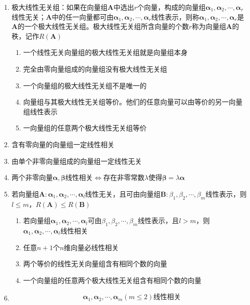 \documentclass[12pt]{book}
\begin{document}
\begin{enumerate}[1.]
    \item 极大线性无关组：如果在向量组$\bm{A}$中选出$r$个向量，构成的向量组$\bm{\alpha}_1,\bm{\alpha}_2,\cdots,\bm{\alpha}_r$线性无关；$\bm{A}$中的任一向量都可由$\bm{\alpha}_1,\bm{\alpha}_2,\cdots,\bm{\alpha}_r$线性表示，则称$\bm{\alpha}_1,\bm{\alpha}_2,\cdots,\bm{\alpha}_r$是$\bm{A}$的一个极大线性无关组。极大线性无关组所含向量的个数$r$称为向量组$\bm{A}$的秩，记作$R(\bm{A})$
    \begin{enumerate}[(1)]
        \item 一个线性无关向量组的极大线性无关组就是向量组本身
        \item 完全由零向量组成的向量组没有极大线性无关组
        \item 一个向量组的极大线性无关组不是唯一的
        \item 向量组与其极大线性无关组等价。他们的任意向量可以由等价的另一向量组线性表示
        \item 一向量组的任意两个极大线性无关组等价
    \end{enumerate}
    \item 含有零向量的向量组一定线性相关
    \item 由单个非零向量组成的向量组一定线性无关
    \item 两个非零向量$\bm{\alpha},\bm{\beta}$线性相关$\Leftrightarrow$存在非零常数$\lambda$使得$\bm{\beta}=\lambda\bm{\alpha}$
    \item 若向量组$\bm{A}:\bm{\alpha}_1,\bm{\alpha}_2,\cdots,\bm{\alpha}_{l}$线性无关，且可由向量组$\bm{B}:\beta_1,\beta_2,\cdots,\beta_m$线性表示，则$l\leqslant m$，$R(\bm{A})\leqslant R(\bm{B})$
    \begin{enumerate}
        \item 若向量组$\bm{\alpha}_1,\bm{\alpha}_2,\cdots,\bm{\alpha}_{l}$可由$\beta_1,\beta_2,\cdots,\beta_m$线性表示，且$l>m$，则$\bm{\alpha}_1,\bm{\alpha}_2,\cdots,\bm{\alpha}_{l}$线性相关 
        \item 任意$n+1$个$n$维向量必线性相关
        \item 两个等价的线性无关向量组含有相同个数的向量
        \item 一个向量组的任意两个极大线性无关组含有相同个数的向量
    \end{enumerate}
    \item
          \begin{align*}
                              & \bm{\alpha}_1,\bm{\alpha}_2,\cdots,\bm{\alpha}_{m} (m\leqslant 2)\text{线性相关}                         \\

\end{align*}
\end{enumerate}
\end{document}
